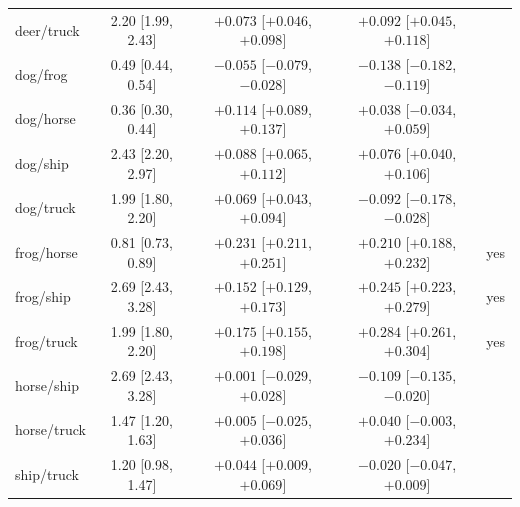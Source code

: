 \begin{table}[h]
\begin{tabular}{lcccc}
deer/truck & 2.20 [1.99, 2.43] & $+0.073$ [$+0.046$, $+0.098$] & $+0.092$ [$+0.045$, $+0.118$] &  \\
dog/frog & 0.49 [0.44, 0.54] & $-0.055$ [$-0.079$, $-0.028$] & $-0.138$ [$-0.182$, $-0.119$] &  \\
dog/horse & 0.36 [0.30, 0.44] & $+0.114$ [$+0.089$, $+0.137$] & $+0.038$ [$-0.034$, $+0.059$] &  \\
dog/ship & 2.43 [2.20, 2.97] & $+0.088$ [$+0.065$, $+0.112$] & $+0.076$ [$+0.040$, $+0.106$] &  \\
dog/truck & 1.99 [1.80, 2.20] & $+0.069$ [$+0.043$, $+0.094$] & $-0.092$ [$-0.178$, $-0.028$] &  \\
frog/horse & 0.81 [0.73, 0.89] & $+0.231$ [$+0.211$, $+0.251$] & $+0.210$ [$+0.188$, $+0.232$] & yes \\
frog/ship & 2.69 [2.43, 3.28] & $+0.152$ [$+0.129$, $+0.173$] & $+0.245$ [$+0.223$, $+0.279$] & yes \\
frog/truck & 1.99 [1.80, 2.20] & $+0.175$ [$+0.155$, $+0.198$] & $+0.284$ [$+0.261$, $+0.304$] & yes \\
horse/ship & 2.69 [2.43, 3.28] & $+0.001$ [$-0.029$, $+0.028$] & $-0.109$ [$-0.135$, $-0.020$] &  \\
horse/truck & 1.47 [1.20, 1.63] & $+0.005$ [$-0.025$, $+0.036$] & $+0.040$ [$-0.003$, $+0.234$] &  \\
ship/truck & 1.20 [0.98, 1.47] & $+0.044$ [$+0.009$, $+0.069$] & $-0.020$ [$-0.047$, $+0.009$] &  \\

\bottomrule
\end{tabular}
\end{table}

